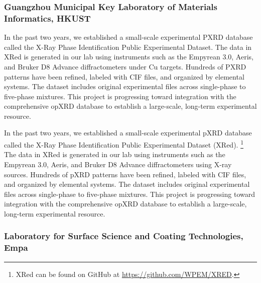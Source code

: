 \subsubsection*{Guangzhou Municipal Key Laboratory of Materials Informatics, HKUST}

In the past two years, we established a small-scale experimental PXRD database called the X-Ray Phase Identification Public Experimental Dataset. The data in XRed is generated in our lab using instruments such as the Empyrean 3.0, Aeris, and Bruker D8 Advance diffractometers under Cu targets. Hundreds of PXRD patterns have been refined, labeled with CIF files, and organized by elemental systems. The dataset includes original experimental files across single-phase to five-phase mixtures. This project is progressing toward integration with the comprehensive opXRD database to establish a large-scale, long-term experimental resource. 

In the past two years, we established a small-scale experimental pXRD database called the X-Ray Phase Identification Public Experimental Dataset (XRed). \footnote{XRed can be found on GitHub at \url{https://github.com/WPEM/XRED}.} The data in XRed is generated in our lab using instruments such as the Empyrean 3.0, Aeris, and Bruker D8 Advance diffractometers using  X-ray sources. Hundreds of pXRD patterns have been refined, labeled with CIF files, and organized by elemental systems. The dataset includes original experimental files across single-phase to five-phase mixtures. This project is progressing toward integration with the comprehensive opXRD database to establish a large-scale, long-term experimental resource. 

\subsubsection*{Laboratory for Surface Science and Coating Technologies, Empa}

